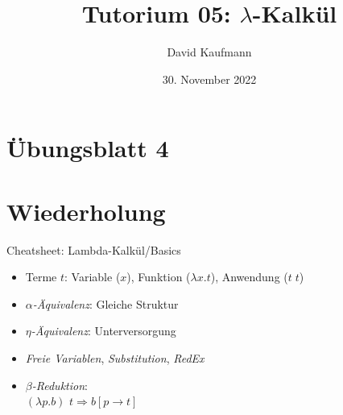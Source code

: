 \documentclass{beamer}
\title{Tutorium 05: $\lambda$-Kalkül}
\author{David Kaufmann}
\institute{Tutorium Programmierparadigmen am KIT}
\date{30. November 2022}
\begin{document}
\begin{frame}
	\titlepage
\end{frame}

\section{Übungsblatt 4}

\section{Wiederholung}

\begin{frame}{Cheatsheet: Lambda-Kalkül/Basics}
  \begin{itemize}
    \item Terme $t$: Variable ($x$), Funktion ($\lambda x . t$), Anwendung ($t \; t$)
    \item \emph{$\alpha$-Äquivalenz}: Gleiche Struktur
    \item \emph{$\eta$-Äquivalenz}: Unterversorgung
    \item \emph{Freie Variablen}, \emph{Substitution}, \emph{RedEx}
    \item \emph{$\beta$-Reduktion}: \\
          $(\lambda{}p.b)$ $t \Rightarrow b\left[p\rightarrow{}t\right]$
  \end{itemize}
\end{frame}
\end{document}

